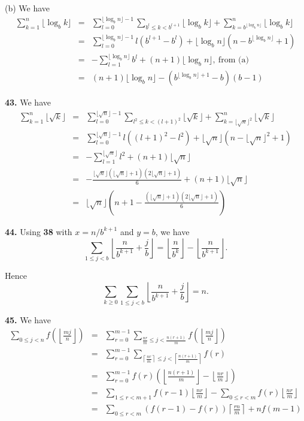 \documentclass[a4paper,12pt]{article}
\newcommand{\newpar}[1]{\bigskip \noindent \textbf{#1.}}
\newcommand{\subpar}[1]{\medskip \noindent (#1)}
\begin{document}
\subpar{b}  We have
\begin{eqnarray*}
  \sum_{k=1}^n\lfloor \log_b k\rfloor &=& \sum_{l=0}^{\lfloor \log_b
    n\rfloor -1} \sum_{b^l \le k < b^{l+1}} \lfloor \log_b k\rfloor +
  \sum_{k = b^{\lfloor \log_b n\rfloor}}^n \lfloor \log_b k\rfloor \\
  &=& \sum_{l=0}^{\lfloor \log_b n\rfloor -1} l(b^{l+1}-b^l) +
  \lfloor \log_b n\rfloor (n - b^{\lfloor \log_b n\rfloor}+1) \\
  &=& - \sum_{l=1}^{\lfloor \log_b n\rfloor} b^l + (n+1) \lfloor
  \log_b n\rfloor,\ \mbox{from (a)}\\
  &=& (n+1)\lfloor \log_b n\rfloor - (b^{\lfloor \log_b n\rfloor +1}-b)(b-1)
\end{eqnarray*}

\newpar{43} We have
\begin{eqnarray*}
  \sum_{k=1}^n \lfloor \sqrt{k}\rfloor &=&
  \sum_{l=0}^{\lfloor \sqrt{n}\rfloor -1} \sum_{l^2 \le k < (l+1)^2}
  \lfloor \sqrt{k}\rfloor + \sum_{k=\lfloor \sqrt{n}\rfloor^2}^n
  \lfloor \sqrt{k}\rfloor \\
  &=& \sum_{l=0}^{\lfloor \sqrt{n}\rfloor -1} l((l+1)^2 - l^2) +
  \lfloor \sqrt{n}\rfloor(n - \lfloor \sqrt{n}\rfloor^2+1) \\
  &=& - \sum_{l=1}^{\lfloor\sqrt{n}\rfloor} l^2 + (n+1)\lfloor
  \sqrt{n}\rfloor \\
  &=& - \frac{\lfloor \sqrt{n}\rfloor (\lfloor \sqrt{n}\rfloor + 1)
    (2\lfloor\sqrt{n}\rfloor+1)}{6} + (n+1)\lfloor \sqrt{n}\rfloor \\
  &=& \lfloor\sqrt{n}\rfloor \left(n+1 - \frac{(\lfloor\sqrt{n}\rfloor
    + 1)(2\lfloor\sqrt{n}\rfloor+1)}{6}\right)
\end{eqnarray*}


\newpar{44}  Using \textbf{38} with $x = n/b^{k+1}$ and $y = b$, we have
\[ \sum_{1\le j<b} \left\lfloor \frac{n}{b^{k+1}} +
\frac{j}{b}\right\rfloor = \left\lfloor\frac{n}{b^k}\right\rfloor -
\left\lfloor\frac{n}{b^{k+1}}\right\rfloor.\]

Hence
\[ \sum_{k\ge 0} \sum_{1\le j<b} \left\lfloor \frac{n}{b^{k+1}} +
\frac{j}{b}\right\rfloor = n.\]

\newpar{45} We have
\begin{eqnarray*}
  \sum_{0\le j<n}f\left( \left\lfloor \frac{mj}{n} \right\rfloor
  \right) &=& \sum_{r=0}^{m-1} \sum_{\frac{nr}{m} \le j <
    \frac{n(r+1)}{m}} f\left( \left\lfloor \frac{mj}{n} \right\rfloor
  \right) \\
  &=& \sum_{r=0}^{m-1} \sum_{\left\lceil \frac{nr}{m}\right\rceil \le
    j < \left\lceil \frac{n(r+1)}{m}\right\rceil} f(r) \\
  &=& \sum_{r=0}^{m-1} f(r) \left( \left\lfloor \frac{n(r+1)}{m}
  \right\rfloor - \left\lfloor \frac{nr}{m} \right\rfloor \right) \\
  &=& \sum_{1\le r <m+1} f(r-1) \left\lfloor \frac{nr}{m}
  \right\rfloor - \sum_{0\le r < m} f(r)\left\lfloor \frac{nr}{m}
  \right\rfloor \\
  &=& \sum_{0\le r < m} (f(r-1) - f(r)) \left\lceil \frac{rn}{m}
  \right\rceil + n f(m-1)
\end{eqnarray*}
\end{document}

